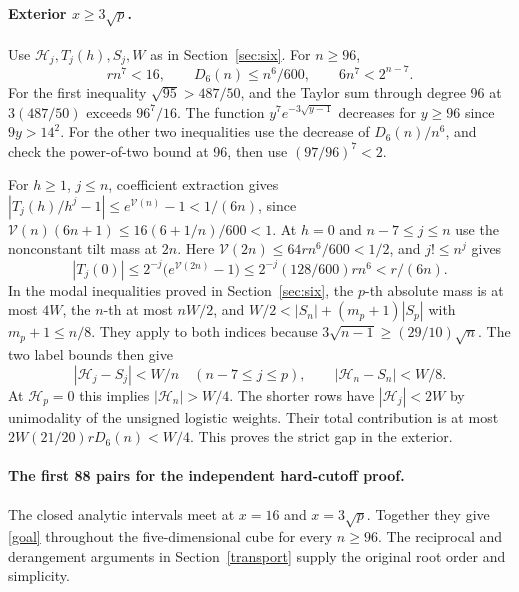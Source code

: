 \paragraph{Exterior \(x\ge3\sqrt p\).}
Use \(\mathcal H_j,T_j(h),S_j,W\) as in Section~\ref{sec:six}.
For \(n\ge96\),
\[
 rn^7<16,\qquad D_6(n)\le n^6/600,\qquad 6n^7<2^{n-7}.
\]
For the first inequality \(\sqrt{95}>487/50\), and the Taylor
sum through degree 96 at \(3(487/50)\) exceeds \(96^7/16\).
The function \(y^7e^{-3\sqrt{y-1}}\) decreases for \(y\ge96\)
since \(9y>14^2\). For the other two inequalities use the decrease of
\(D_6(n)/n^6\), and check the power-of-two bound at 96, then use
\((97/96)^7<2\).

For \(h\ge1\), \(j\le n\), coefficient extraction gives
\(|T_j(h)/h^j-1|\le e^{\mathcal V(n)}-1<1/(6n)\), since
\(\mathcal V(n)(6n+1)\le 16(6+1/n)/600<1\).
At \(h=0\) and \(n-7\le j\le n\) use the nonconstant tilt mass at \(2n\).
Here \(\mathcal V(2n)\le64rn^6/600<1/2\), and \(j!\le n^j\) gives
\[
 |T_j(0)|\le 2^{-j}\bigl(e^{\mathcal V(2n)}-1\bigr)
          \le 2^{-j}(128/600)rn^6<r/(6n).
\]
In the modal inequalities proved in Section~\ref{sec:six}, the
\(p\)-th absolute mass is at most \(4W\), the \(n\)-th at most
\(nW/2\), and
\(W/2<|S_n|+(m_p+1)|S_p|\) with \(m_p+1\le n/8\).
They apply to both indices because \(3\sqrt{n-1}\ge(29/10)\sqrt{n}\).
The two label bounds then give
\[
 |\mathcal H_j-S_j|<W/n\quad(n-7\le j\le p),\qquad
 |\mathcal H_n-S_n|<W/8 .
\]
At \(\mathcal H_p=0\) this implies \(|\mathcal H_n|>W/4\).
The shorter rows have \(|\mathcal H_j|<2W\) by unimodality of the
unsigned logistic weights. Their total contribution is at most
\(2W(21/20)rD_6(n)<W/4\). This proves the strict gap in the exterior.

\paragraph{The first 88 pairs for the independent hard-cutoff proof.}
The closed analytic intervals meet at \(x=16\) and \(x=3\sqrt p\).
Together they give \eqref{goal} throughout the five-dimensional cube
for every \(n\ge96\). The reciprocal and derangement arguments in
Section~\ref{transport} supply the original root order and simplicity.

